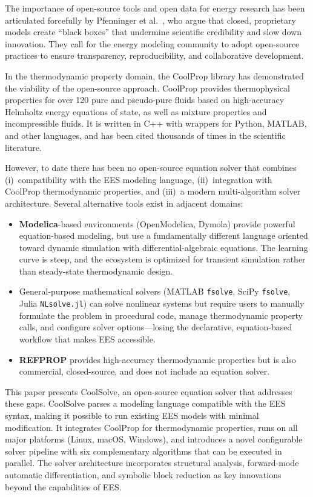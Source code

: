 \documentclass[review,3p]{elsarticle}
\begin{document}
The importance of open-source tools and open data for energy research has been articulated forcefully by Pfenninger et al.\ \cite{Pfenninger2017, Pfenninger2018}, who argue that closed, proprietary models create ``black boxes'' that undermine scientific credibility and slow down innovation. They call for the energy modeling community to adopt open-source practices to ensure transparency, reproducibility, and collaborative development.

In the thermodynamic property domain, the CoolProp library \cite{Bell2014} has demonstrated the viability of the open-source approach. CoolProp provides thermophysical properties for over 120 pure and pseudo-pure fluids based on high-accuracy Helmholtz energy equations of state, as well as mixture properties and incompressible fluids. It is written in C++ with wrappers for Python, MATLAB, and other languages, and has been cited thousands of times in the scientific literature.

However, to date there has been no open-source equation solver that combines (i)~compatibility with the EES modeling language, (ii)~integration with CoolProp thermodynamic properties, and (iii)~a modern multi-algorithm solver architecture. Several alternative tools exist in adjacent domains:
\begin{itemize}
    \item \textbf{Modelica}-based environments (OpenModelica, Dymola) \cite{Modelica2023, Wetter2014} provide powerful equation-based modeling, but use a fundamentally different language oriented toward dynamic simulation with differential-algebraic equations. The learning curve is steep, and the ecosystem is optimized for transient simulation rather than steady-state thermodynamic design.
    \item General-purpose mathematical solvers (MATLAB \texttt{fsolve}, SciPy \texttt{fsolve}, Julia \texttt{NLsolve.jl}) can solve nonlinear systems but require users to manually formulate the problem in procedural code, manage thermodynamic property calls, and configure solver options---losing the declarative, equation-based workflow that makes EES accessible.
    \item \textbf{REFPROP} \cite{Wagner2002} provides high-accuracy thermodynamic properties but is also commercial, closed-source, and does not include an equation solver.
\end{itemize}

This paper presents CoolSolve, an open-source equation solver that addresses these gaps. CoolSolve parses a modeling language compatible with the EES syntax, making it possible to run existing EES models with minimal modification. It integrates CoolProp for thermodynamic properties, runs on all major platforms (Linux, macOS, Windows), and introduces a novel configurable solver pipeline with six complementary algorithms that can be executed in parallel. The solver architecture incorporates structural analysis, forward-mode automatic differentiation, and symbolic block reduction as key innovations beyond the capabilities of EES.
\end{document}
